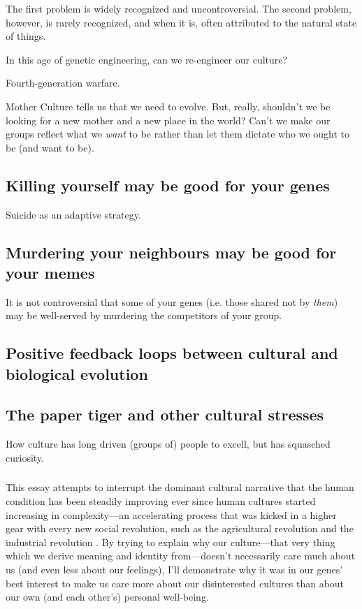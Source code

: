 \documentclass{article}
\begin{document}
The first problem is widely recognized and uncontroversial. The second problem,
however, is rarely recognized, and when it is, often attributed to the natural
state of things.

In this age of genetic engineering, can we re-engineer our culture?

Fourth-generation warfare.

Mother Culture tells us that we need to evolve. But, really, shouldn't we be
looking for a new mother and a new place in the world? Can't we make our groups
reflect what we \textit{want} to be rather than let them dictate who we ought to
be (and want to be).

\subsection{Killing yourself may be good for your genes}

Suicide as an adaptive strategy.

\subsection{Murdering your neighbours may be good for your memes}

It is not controversial that some of your genes (i.e. those shared not by \emph{them}) may be well-served by murdering the competitors of your group.

\subsection{Positive feedback loops between cultural and biological evolution}

\subsection{The paper tiger and other cultural stresses}

How culture has long driven (groups of) people to excell, but has squasched curiosity.

\subsubsection{}

This essay attempts to interrupt the dominant cultural narrative that the human
condition has been steadily improving ever since human cultures started
increasing in complexity---an accelerating process that was kicked in a higher
gear with every new social revolution, such as the agricultural revolution and
the industrial revolution \citep{botton2013}. By trying to explain why our
culture---that very thing which we derive meaning and identity from---doesn't
necessarily care much about us (and even less about our feelings), I'll
demonstrate why it was in our genes' best interest to make us care more about
our disinterested cultures than about our own (and each other's) personal
well-being.
\end{document}

